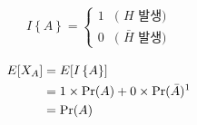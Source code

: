 \begin{align*}
    I\left\{ A \right\} =  
\begin{cases}
    1 &\mbox{( $H$ 발생)} \\
    0 &\mbox{( $\bar{H}$ 발생)}
\end{cases}    
\end{align*}


\begin{align*}
    E[X_A] &=  E[I \left\{ A \right\} ] \\
    &= 1 \times \Pr (A) + 0 \times \Pr(\bar{A}) \text{\footnotemark} \\
    &=\Pr (A)     
\end{align*}

